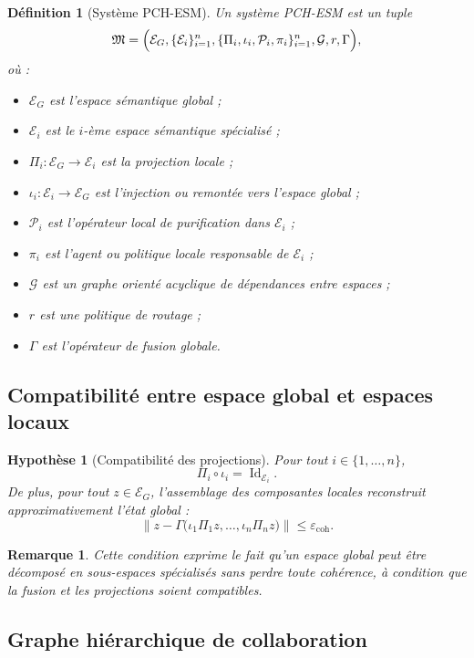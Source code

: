 \documentclass[11pt,a4paper]{article}
\newtheorem{definition}{Définition}[section]
\newtheorem{assumption}{Hypothèse}[section]
\newtheorem{remark}{Remarque}[section]
\DeclareMathOperator{\Id}{Id}
\newcommand{\E}{\mathcal E}
\newcommand{\Pcal}{\mathcal P}
\newcommand{\Gcal}{\mathcal G}
\newcommand{\1}{\mathbf 1}
\begin{document}
\begin{definition}[Système PCH-ESM]
Un système PCH-ESM est un tuple
\[
\mathfrak M
=
\Bigl(
\E_G,
\{\E_i\}_{i=1}^n,
\{\Pi_i,\iota_i,\Pcal_i,\pi_i\}_{i=1}^n,
\Gcal,
r,
\Gamma
\Bigr),
\]
où :

\begin{itemize}[leftmargin=2em]
    \item \(\E_G\) est l'espace sémantique global ;
    \item \(\E_i\) est le \(i\)-ème espace sémantique spécialisé ;
    \item \(\Pi_i:\E_G\to\E_i\) est la projection locale ;
    \item \(\iota_i:\E_i\to\E_G\) est l'injection ou remontée vers l'espace global ;
    \item \(\Pcal_i\) est l'opérateur local de purification dans \(\E_i\) ;
    \item \(\pi_i\) est l'agent ou politique locale responsable de \(\E_i\) ;
    \item \(\Gcal\) est un graphe orienté acyclique de dépendances entre espaces ;
    \item \(r\) est une politique de routage ;
    \item \(\Gamma\) est l'opérateur de fusion globale.
\end{itemize}
\end{definition}

\subsection{Compatibilité entre espace global et espaces locaux}

\begin{assumption}[Compatibilité des projections]
Pour tout \(i\in\{1,\dots,n\}\),
\[
\Pi_i\circ \iota_i = \Id_{\E_i}.
\]
De plus, pour tout \(z\in\E_G\), l'assemblage des composantes locales reconstruit approximativement l'état global :
\[
\left\| z - \Gamma\bigl(\iota_1\Pi_1 z,\dots,\iota_n\Pi_n z\bigr)\right\|
\le \varepsilon_{\mathrm{coh}}.
\]
\end{assumption}

\begin{remark}
Cette condition exprime le fait qu'un espace global peut être décomposé en sous-espaces spécialisés sans perdre toute cohérence, à condition que la fusion et les projections soient compatibles.
\end{remark}

\subsection{Graphe hiérarchique de collaboration}
\end{document}
